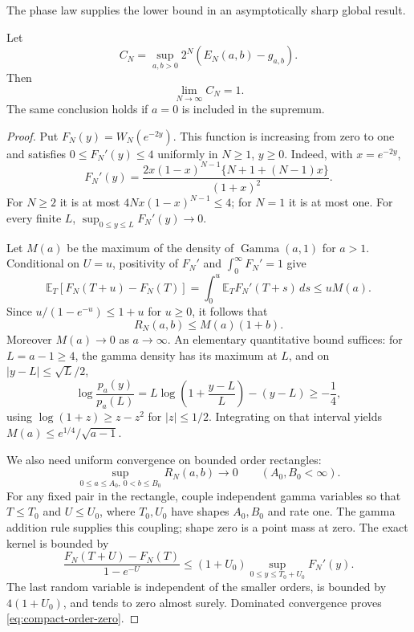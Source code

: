 The phase law supplies the lower bound in an asymptotically
sharp global result.

\begin{theorem}
\label{thm:euler-asymptotic-budget}
Let
\[
 C_N=\sup_{a,b>0}2^N(E_N(a,b)-g_{a,b}).
\]
Then
\begin{equation}\label{eq:CN-limit}
 \lim_{N\to\infty}C_N=1.
\end{equation}
The same conclusion holds if $a=0$ is included in the supremum.
\end{theorem}
\begin{proof}
Put $F_N(y)=W_N(e^{-2y})$. This function is increasing from
zero to one and satisfies $0\leq F_N'(y)\leq4$ uniformly in
$N\geq1$, $y\geq0$. Indeed, with $x=e^{-2y}$,
\[
 F_N'(y)=
 \frac{2x(1-x)^{N-1}\{N+1+(N-1)x\}}{(1+x)^2}.
\]
For $N\geq2$ it is at most
$4Nx(1-x)^{N-1}\leq4$; for $N=1$ it is at most one.
For every finite $L$, $\sup_{0\leq y\leq L}F_N'(y)\to0$.

Let $M(a)$ be the maximum of the density of
$\operatorname{Gamma}(a,1)$ for $a>1$. Conditional on $U=u$,
positivity of $F_N'$ and $\int_0^\infty F_N'=1$ give
\[
 \mathbb E_T[F_N(T+u)-F_N(T)]
 =\int_0^u\mathbb E_T F_N'(T+s)\,ds
 \leq uM(a).
\]
Since $u/(1-e^{-u})\leq1+u$ for $u\geq0$, it follows that
\begin{equation}\label{eq:large-a-bound}
 R_N(a,b)\leq M(a)(1+b).
\end{equation}
Moreover $M(a)\to0$ as $a\to\infty$. An elementary quantitative
bound suffices: for $L=a-1\geq4$, the gamma density has its
maximum at $L$, and on $|y-L|\leq\sqrt L/2$,
\[
 \log\frac{p_a(y)}{p_a(L)}
 =L\log\left(1+\frac{y-L}{L}\right)-(y-L)\geq-\frac14,
\]
using $\log(1+z)\geq z-z^2$ for $|z|\leq1/2$.
Integrating on that interval yields
$M(a)\leq e^{1/4}/\sqrt{a-1}$.

We also need uniform convergence on bounded order rectangles:
\begin{equation}\label{eq:compact-order-zero}
 \sup_{0\leq a\leq A_0,\ 0<b\leq B_0}R_N(a,b)\longrightarrow0
 \qquad(A_0,B_0<\infty).
\end{equation}
For any fixed pair in the rectangle, couple independent gamma
variables so that $T\leq T_0$ and $U\leq U_0$, where
$T_0,U_0$ have shapes $A_0,B_0$ and rate one. The gamma
addition rule supplies this coupling; shape zero is a point
mass at zero. The exact kernel is bounded by
\[
 \frac{F_N(T+U)-F_N(T)}{1-e^{-U}}
 \leq(1+U_0)\sup_{0\leq y\leq T_0+U_0}F_N'(y).
\]
The last random variable is independent of the smaller
orders, is bounded by $4(1+U_0)$, and tends to zero almost
surely. Dominated convergence proves
\eqref{eq:compact-order-zero}.


\end{proof}
